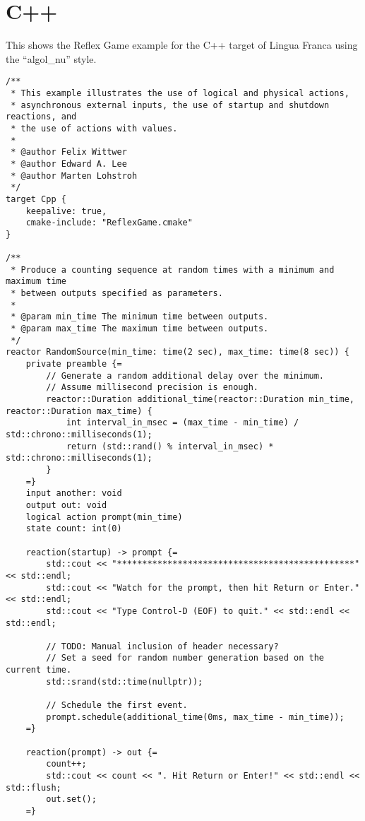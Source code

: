 \documentclass{article}
\begin{document}
\newpage
\section{C++}

This shows the Reflex Game example for the C++ target of Lingua Franca using the
``algol\_nu'' style.

\begin{verbatim}
/**
 * This example illustrates the use of logical and physical actions,
 * asynchronous external inputs, the use of startup and shutdown reactions, and
 * the use of actions with values.
 *
 * @author Felix Wittwer
 * @author Edward A. Lee
 * @author Marten Lohstroh
 */
target Cpp {
    keepalive: true,
    cmake-include: "ReflexGame.cmake"
}

/**
 * Produce a counting sequence at random times with a minimum and maximum time
 * between outputs specified as parameters.
 *
 * @param min_time The minimum time between outputs.
 * @param max_time The maximum time between outputs.
 */
reactor RandomSource(min_time: time(2 sec), max_time: time(8 sec)) {
    private preamble {=
        // Generate a random additional delay over the minimum.
        // Assume millisecond precision is enough.
        reactor::Duration additional_time(reactor::Duration min_time, reactor::Duration max_time) {
            int interval_in_msec = (max_time - min_time) / std::chrono::milliseconds(1);
            return (std::rand() % interval_in_msec) * std::chrono::milliseconds(1);
        }
    =}
    input another: void
    output out: void
    logical action prompt(min_time)
    state count: int(0)

    reaction(startup) -> prompt {=
        std::cout << "***********************************************" << std::endl;
        std::cout << "Watch for the prompt, then hit Return or Enter." << std::endl;
        std::cout << "Type Control-D (EOF) to quit." << std::endl << std::endl;

        // TODO: Manual inclusion of header necessary?
        // Set a seed for random number generation based on the current time.
        std::srand(std::time(nullptr));

        // Schedule the first event.
        prompt.schedule(additional_time(0ms, max_time - min_time));
    =}

    reaction(prompt) -> out {=
        count++;
        std::cout << count << ". Hit Return or Enter!" << std::endl << std::flush;
        out.set();
    =}


\end{verbatim}
\end{document}
